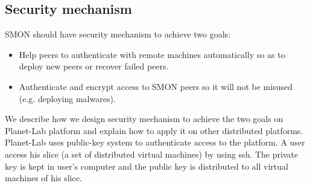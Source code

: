 



\subsection{Security mechanism}
\label{subsec:security}

SMON should have security mechanism to achieve two goals:

\begin{itemize}

  \item Help peers to authenticate with remote machines
  automatically so as to deploy new peers or recover failed
  peers.

  \item Authenticate and encrypt access to SMON peers so it
  will not be misused (e.g. deploying malwares).

\end{itemize}


We describe how we design security mechanism to achieve the
two goals on Planet-Lab platform and explain how to apply it
on other distributed platforms.  Planet-Lab uses public-key
system to authenticate access to the platform. A user access
his slice (a set of distributed virtual machines) by using
ssh. The private key is kept in user's computer and the
public key is distributed to all virtual machines of his
slice.



